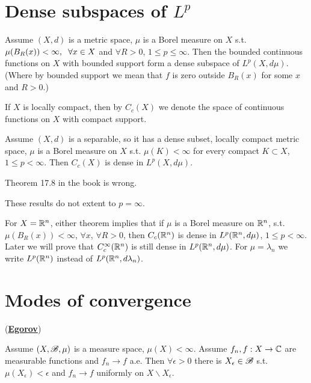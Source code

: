 \section{Dense subspaces of $L^p$}
\begin{theorem}
    Assume $(X,d)$ is a metric space, $\mu$ is a Borel measure on $X$ s.t. $\mu(B_R(x))<\infty,\hspace{2mm} \forall x\in X$ and 
    $\forall R>0$, $1\leq p\leq \infty$. Then the bounded continuous functions on $X$ with bounded support form a dense subspace of $L^p(X,d\mu)$.
    (Where by bounded support we mean that $f$ is zero outside $B_R(x)$ for some $x$ and $R>0$.)
\end{theorem}

If $X$ is locally compact, then by $C_c(X)$ we denote the space of continuous functions on $X$ with compact support.

\begin{theorem}
    Assume $(X,d)$ is a separable, so it has a dense subset, locally compact metric space,
     $\mu$ is a Borel measure on $X$ s.t. $\mu(K)<\infty$ for every compact $K\subset X$, $1\leq p<\infty$. Then $C_c(X)$ is dense in $L^p(X,d\mu)$.
\end{theorem}

\begin{remark}
    Theorem 17.8 in the book is wrong.
\end{remark}

\begin{remark}
    These results do not extent to $p=\infty$.
\end{remark}
For $X=\mathbb{R}^n$, either theorem implies that if $\mu$ is a Borel measure on $\mathbb{R}^n$, s.t. $\mu(B_R(x))<\infty$, $\forall x$, $\forall R>0$, then
$C_c(\mathbb{R}^n)$ is dense in $L^p(\mathbb{R}^n,d\mu)$, $1\leq p<\infty$. Later we will prove that $C_c^\infty (\mathbb{R}^n)$ is still dense in $L^p(\mathbb{R}^n,d\mu)$.
 For $\mu=\lambda_n$ we write $L^p(\mathbb{R}^n)$ instead of $L^p(\mathbb{R}^n,d\lambda_n)$.



\section*{Modes of convergence}
\begin{theorem}(\underline{\textbf{Egorov}})

    Assume $(X,\mathscr{B},\mu)$ is a measure space, $\mu(X)<\infty$. Assume $f_n,f:X\rightarrow\mathbb{C}$ are measurable functions and 
    $f_n\rightarrow f$ a.e. Then $\forall \epsilon>0$ there is $X_\epsilon \in\mathscr{B}$ s.t. $\mu(X_\epsilon)<\epsilon$ and $f_n\rightarrow f$ uniformly on $X\backslash X_\epsilon$. 
\end{theorem}

